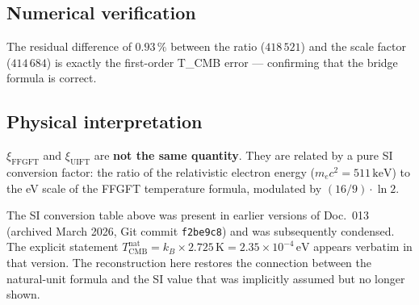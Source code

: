 \subsection*{Numerical verification}

\begin{center}
\renewcommand{\arraystretch}{1.35}
{\small
{}
}
\end{center}

The residual difference of $0.93\,\%$ between the ratio ($418\,521$) and the
scale factor ($414\,684$) is exactly the first-order T\_CMB error — confirming
that the bridge formula is correct.

\subsection*{Physical interpretation}

$\xi_\text{FFGFT}$ and $\xi_\text{UIFT}$ are \textbf{not the same quantity}.
They are related by a pure SI conversion factor: the ratio of the relativistic
electron energy ($m_ec^2 = 511\,\text{keV}$) to the eV scale of the FFGFT
temperature formula, modulated by $(16/9)\cdot\ln 2$.

The SI conversion table above was present in earlier versions of Doc.~013
(archived March 2026, Git commit \texttt{f2be9c8}) and was subsequently
condensed. The explicit statement
$T_\text{CMB}^\text{nat} = k_B \times 2.725\,\text{K} = 2.35\times10^{-4}\,\text{eV}$
appears verbatim in that version. The reconstruction here restores the
connection between the natural-unit formula and the SI value that was
implicitly assumed but no longer shown.

